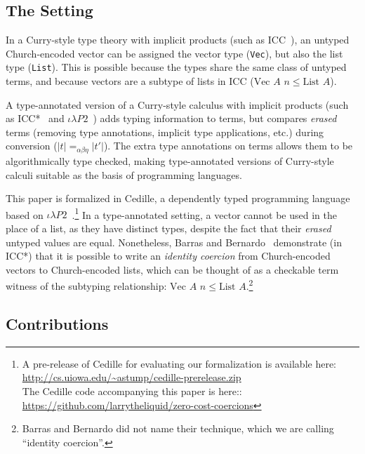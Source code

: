 \documentclass[a4paper,envcountsame,envcountsect]{llncs}
\newcommand{\earg}[1]{\,\,#1}
\newcommand{\subtp}[0]{\leq}
\newcommand{\cdle}[0]{\ensuremath{\iota \lambda P2}~}
\newcommand{\erase}[1]{\ensuremath{\lvert #1 \rvert}}
\newcommand{\name}[1]{\textrm{#1}}
\begin{document}
\subsection{The Setting}

In a Curry-style type theory with implicit
products (such as ICC~\cite{miquel:implicit}),
an untyped Church-encoded vector can be assigned
the vector type (\texttt{Vec}),
but also the list type (\texttt{List}).
This is possible because the types share the same class of untyped
terms, and because vectors are a subtype of lists in ICC
($\name{Vec} \earg A \earg n \subtp \name{List} \earg A$).

A type-annotated version of a Curry-style
calculus with implicit products
(such as ICC*~\cite{barras:implicit} and
\cdle\cite{stump17b}) adds typing information to terms, but compares
\textit{erased} terms (removing type annotations, implicit type
applications, etc.) during conversion
($\erase{t} =_{\alpha\beta\eta} \erase{t'}$).
The extra type annotations on terms allows them
to be algorithmically type checked, making type-annotated versions of
Curry-style calculi suitable as the basis of programming languages.

This paper is formalized in Cedille, a dependently typed programming
language based on \cdle.\footnote{\raggedright{A pre-release of Cedille for
evaluating our formalization is available here:\\
\url{http://cs.uiowa.edu/~astump/cedille-prerelease.zip}}\\
  The Cedille code accompanying this paper is here::\\
  \url{https://github.com/larrytheliquid/zero-cost-coercions}}
In a type-annotated setting, a vector cannot be used in
the place of a list, as they have distinct types, despite the fact that
their \textit{erased} untyped values are equal.
Nonetheless, Barras and Bernardo~\cite{barras:implicit} demonstrate
(in ICC*) that it is possible to write an \textit{identity coercion} from
Church-encoded vectors to Church-encoded lists, which can be thought
of as a checkable term witness of the subtyping relationship:
$\name{Vec} \earg A \earg n \subtp \name{List} \earg
A$.\footnote{Barras and Bernardo did not name their technique, which
  we are calling ``identity coercion''.
  }

\subsection{Contributions}
\end{document}
